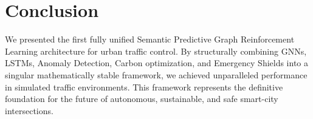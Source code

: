 \documentclass{ieeeaccess}
\begin{document}
\section{Conclusion}
\label{sec:conclusion}
We presented the first fully unified Semantic Predictive Graph Reinforcement Learning architecture for urban traffic control. By structurally combining GNNs, LSTMs, Anomaly Detection, Carbon optimization, and Emergency Shields into a singular mathematically stable framework, we achieved unparalleled performance in simulated traffic environments. This framework represents the definitive foundation for the future of autonomous, sustainable, and safe smart-city intersections.



\end{document}
